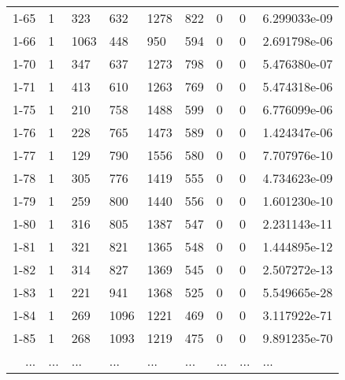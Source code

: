 \documentclass[11pt]{article}
\begin{document}
\begin{tabular}{r|llllllll}
	1-65 & 1            &  323         &  632         & 1278         &  822         & 0            & 0            & 6.299033e-09\\
	1-66 & 1            & 1063         &  448         &  950         &  594         & 0            & 0            & 2.691798e-06\\
	1-70 & 1            &  347         &  637         & 1273         &  798         & 0            & 0            & 5.476380e-07\\
	1-71 & 1            &  413         &  610         & 1263         &  769         & 0            & 0            & 5.474318e-06\\
	1-75 & 1            &  210         &  758         & 1488         &  599         & 0            & 0            & 6.776099e-06\\
	1-76 & 1            &  228         &  765         & 1473         &  589         & 0            & 0            & 1.424347e-06\\
	1-77 & 1            &  129         &  790         & 1556         &  580         & 0            & 0            & 7.707976e-10\\
	1-78 & 1            &  305         &  776         & 1419         &  555         & 0            & 0            & 4.734623e-09\\
	1-79 & 1            &  259         &  800         & 1440         &  556         & 0            & 0            & 1.601230e-10\\
	1-80 & 1            &  316         &  805         & 1387         &  547         & 0            & 0            & 2.231143e-11\\
	1-81 & 1            &  321         &  821         & 1365         &  548         & 0            & 0            & 1.444895e-12\\
	1-82 & 1            &  314         &  827         & 1369         &  545         & 0            & 0            & 2.507272e-13\\
	1-83 & 1            &  221         &  941         & 1368         &  525         & 0            & 0            & 5.549665e-28\\
	1-84 & 1            &  269         & 1096         & 1221         &  469         & 0            & 0            & 3.117922e-71\\
	1-85 & 1            &  268         & 1093         & 1219         &  475         & 0            & 0            & 9.891235e-70\\
	... & ... & ... & ... & ... & ... & ... & ... & ...\\

\end{tabular}
\end{document}
